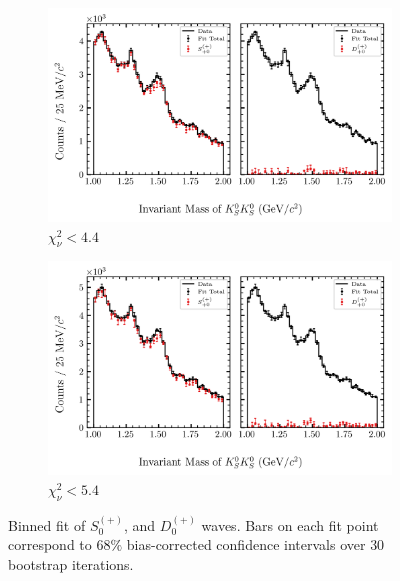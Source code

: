 \begin{figure}[htbp]
    \begin{subfigure}{0.45\textwidth}
        \includegraphics[width=\linewidth]{figures/binned_fit_chisqdof_4.4_splot_D_1s_2b_phase_factor_waves487_uncertainty_bootstrap-CI-BC.png}
        \caption{$\chi^2_\nu < 4.4$}
    \end{subfigure}
    \hfill
    \begin{subfigure}{0.45\textwidth}
        \includegraphics[width=\linewidth]{figures/binned_fit_chisqdof_5.4_splot_D_1s_2b_phase_factor_waves487_uncertainty_bootstrap-CI-BC.png}
        \caption{$\chi^2_\nu < 5.4$}
    \end{subfigure}

    \caption{Binned fit of $S_{0}^{(+)}$, and $D_{0}^{(+)}$ waves. Bars on each fit point correspond to $68\%$ bias-corrected confidence intervals over $ 30 $ bootstrap iterations.}
    \label{fig:binned-fit-all-Sp-D0p}
\end{figure}

